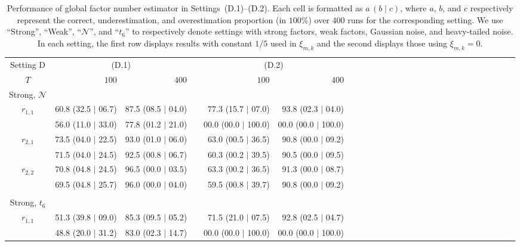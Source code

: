 \documentclass[aos]{imsart}
\theoremstyle{plain}
\theoremstyle{definition}
\def\cN{\mathcal{N}}
\begin{document}
\begin{table}%
\caption{Performance of global factor number estimator in Settings~(D.1)--(D.2). Each cell is formatted as $a \,(b \mid c)$, where $a$, $b$, and $c$ respectively represent the correct, underestimation, and overestimation proportion (in $100\%$) over 400 runs for the corresponding setting. We use ``Strong'', ``Weak'', ``$\cN$'', and ``$t_6$'' to respectively denote settings with strong factors, weak factors, Gaussian noise, and heavy-tailed noise. In each setting, the first row displays results with constant $1/5$ used in $\xi_{m,k}$ and the second displays those using $\xi_{m,k}=0$.}
\label{tab: simulation_setting_D}
\begin{tabular}{@{}crrrrrrrrrrrrrrrrrrrrrrrrr@{}}
\hline %
Setting D & \multicolumn{2}{c}{(D.1)} && \multicolumn{2}{c}{(D.2)}  \\
$T$
&  $100$ & $400$ && $100$ & $400$ \\
\hline %
\multicolumn{1}{c}{Strong, $\cN$}  \\
$r_{1,1}$ &  60.8 (32.5 $\mid$ 06.7)  & 87.5 (08.5 $\mid$ 04.0) && 77.3 (15.7 $\mid$ 07.0) & 93.8 (02.3 $\mid$ 04.0)  \\
          &  56.0 (11.0 $\mid$ 33.0)  & 77.8 (01.2 $\mid$ 21.0) && 00.0 (00.0 $\mid$ 100.0) & 00.0 (00.0 $\mid$ 100.0) \\
$r_{2,1}$ &  73.5 (04.0 $\mid$ 22.5) & 93.0 (01.0 $\mid$ 06.0) && 63.0 (00.5 $\mid$ 36.5) & 90.8 (00.0 $\mid$ 09.2) \\
          &  71.5 (04.0 $\mid$ 24.5) & 92.5 (00.8 $\mid$ 06.7) && 60.3 (00.2 $\mid$ 39.5) & 90.5 (00.0 $\mid$ 09.5) \\
$r_{2,2}$ &  70.8 (04.8 $\mid$ 24.5) & 96.5 (00.0 $\mid$ 03.5) && 63.3 (00.2 $\mid$ 36.5) & 91.3 (00.0 $\mid$ 08.7) \\
          &  69.5 (04.8 $\mid$ 25.7)  & 96.0 (00.0 $\mid$ 04.0) && 59.5 (00.8 $\mid$ 39.7) & 90.8 (00.0 $\mid$ 09.2) \\
\\
\multicolumn{1}{c}{Strong, $t_6$} \\
$r_{1,1}$ &  51.3 (39.8 $\mid$ 09.0) & 85.3 (09.5 $\mid$ 05.2) && 71.5 (21.0 $\mid$ 07.5) & 92.8 (02.5 $\mid$ 04.7) \\
          &  48.8 (20.0 $\mid$ 31.2)  & 83.0 (02.3 $\mid$ 14.7) && 00.0 (00.0 $\mid$ 100.0) & 00.0 (00.0 $\mid$ 100.0) \\

\end{tabular}
\end{table}
\end{document}
